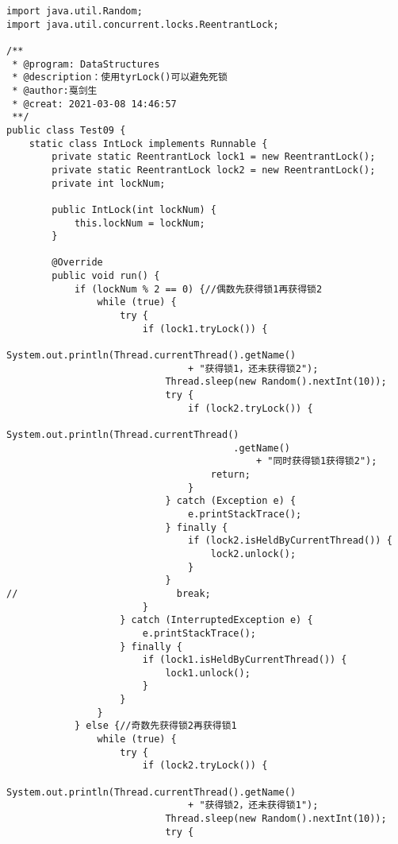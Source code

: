\documentclass[a4paper]{report}
\begin{document}
\begin{Verbatim}[frame=single,numbersep=5pt,xleftmargin=1.5em,xrightmargin=1.5em]
import java.util.Random;
import java.util.concurrent.locks.ReentrantLock;

/**
 * @program: DataStructures
 * @description：使用tyrLock()可以避免死锁
 * @author:戛剑生
 * @creat: 2021-03-08 14:46:57
 **/
public class Test09 {
    static class IntLock implements Runnable {
        private static ReentrantLock lock1 = new ReentrantLock();
        private static ReentrantLock lock2 = new ReentrantLock();
        private int lockNum;

        public IntLock(int lockNum) {
            this.lockNum = lockNum;
        }

        @Override
        public void run() {
            if (lockNum % 2 == 0) {//偶数先获得锁1再获得锁2
                while (true) {
                    try {
                        if (lock1.tryLock()) {
                            System.out.println(Thread.currentThread().getName()
                                + "获得锁1，还未获得锁2");
                            Thread.sleep(new Random().nextInt(10));
                            try {
                                if (lock2.tryLock()) {
                                    System.out.println(Thread.currentThread()
                                        .getName()
                                            + "同时获得锁1获得锁2");
                                    return;
                                }
                            } catch (Exception e) {
                                e.printStackTrace();
                            } finally {
                                if (lock2.isHeldByCurrentThread()) {
                                    lock2.unlock();
                                }
                            }
//                            break;
                        }
                    } catch (InterruptedException e) {
                        e.printStackTrace();
                    } finally {
                        if (lock1.isHeldByCurrentThread()) {
                            lock1.unlock();
                        }
                    }
                }
            } else {//奇数先获得锁2再获得锁1
                while (true) {
                    try {
                        if (lock2.tryLock()) {
                            System.out.println(Thread.currentThread().getName()
                                + "获得锁2，还未获得锁1");
                            Thread.sleep(new Random().nextInt(10));
                            try {

\end{Verbatim}
\end{document}

